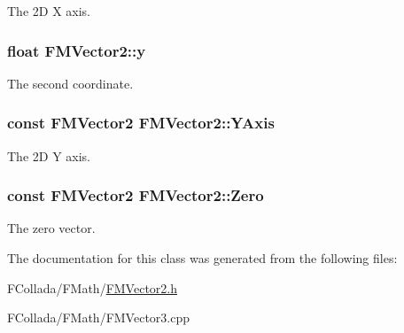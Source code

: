 \label{classFMVector2_af1e472e6de273133987bb212befb2615}
The 2D X axis. \hypertarget{classFMVector2_a2220c4429844ade53dc10c5e8b1d87e0}{
\subsubsection[{y}]{\setlength{\rightskip}{0pt plus 5cm}float {\bf FMVector2::y}}}
\label{classFMVector2_a2220c4429844ade53dc10c5e8b1d87e0}
The second coordinate. \hypertarget{classFMVector2_ab5048e7e1432c3c0a96a84a91348830b}{
\subsubsection[{YAxis}]{\setlength{\rightskip}{0pt plus 5cm}const {\bf FMVector2} {\bf FMVector2::YAxis}}}
\label{classFMVector2_ab5048e7e1432c3c0a96a84a91348830b}
The 2D Y axis. \hypertarget{classFMVector2_aff17a6d216a00383aeeaf94655168bc8}{
\subsubsection[{Zero}]{\setlength{\rightskip}{0pt plus 5cm}const {\bf FMVector2} {\bf FMVector2::Zero}}}
\label{classFMVector2_aff17a6d216a00383aeeaf94655168bc8}
The zero vector. 

The documentation for this class was generated from the following files:\begin{DoxyCompactItemize}
\item 
FCollada/FMath/\hyperlink{FMVector2_8h}{FMVector2.h}\item 
FCollada/FMath/FMVector3.cpp\end{DoxyCompactItemize}
